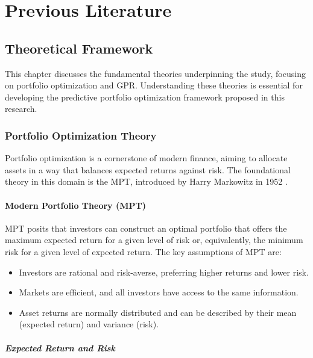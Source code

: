 
\chapter{Previous Literature}\label{chapter:previous literature}

\section{Theoretical Framework}

This chapter discusses the fundamental theories underpinning the study, focusing on portfolio optimization and \ac{GPR}. Understanding these theories is essential for developing the predictive portfolio optimization framework proposed in this research.

\subsection{Portfolio Optimization Theory}

Portfolio optimization is a cornerstone of modern finance, aiming to allocate assets in a way that balances expected returns against risk. The foundational theory in this domain is the \ac{MPT}, introduced by Harry Markowitz in 1952 \cite{markowitz1952portfolio}.

\subsubsection{Modern Portfolio Theory (MPT)}

\ac{MPT} posits that investors can construct an optimal portfolio that offers the maximum expected return for a given level of risk or, equivalently, the minimum risk for a given level of expected return. The key assumptions of MPT are:

\begin{itemize}
    \item Investors are rational and risk-averse, preferring higher returns and lower risk.
    \item Markets are efficient, and all investors have access to the same information.
    \item Asset returns are normally distributed and can be described by their mean (expected return) and variance (risk).
\end{itemize}

\paragraph{Expected Return and Risk}


